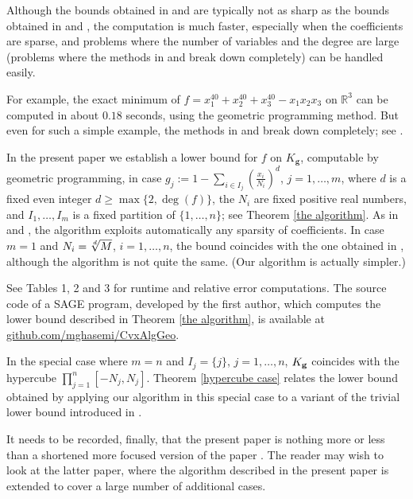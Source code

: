 \documentclass{amsart}
\theoremstyle{definition}
\begin{document}
Although the bounds obtained in \cite{gha-lass-mar} and \cite{gha-mar2} are typically not as sharp as the bounds obtained in \cite{lasserre1} and \cite{WKKM}, the computation is much faster, especially when the coefficients are sparse, and problems where the number of variables and the degree are large (problems where the methods in \cite{lasserre1} and \cite{WKKM} break down completely) can be handled easily.

For example, the exact minimum of $f=x_1^{40}+x_2^{40}+x_3^{40}-x_1x_2x_3$ on $\mathbb{R}^3$ can be computed in about $0.18$ seconds, using the geometric programming method.
But even for such a simple example, the methods in \cite{lasserre1} and \cite{WKKM} break down completely; see \cite[Example 3.9]{gha-mar2}.

In the present paper we establish a lower bound for $f$ on $K_{\mathbf{g}}$, computable by geometric
programming, in case $g_j := 1-\sum_{i\in I_j} (\frac{x_i}{N_i})^d$, $j=1,\dots,m$, where $d$ is a fixed even integer $d \ge \max\{ 2, \deg(f)\}$, the $N_i$ are fixed positive real numbers, and  $I_1,\dots, I_m$ is a fixed partition of $\{ 1,\dots,n\}$; see Theorem \ref{the algorithm}. As in \cite{gha-lass-mar} and \cite{gha-mar2}, the algorithm exploits automatically any sparsity of coefficients.
In case $m=1$ and $N_i = \root d \of{M}$, $i=1,\dots, n$, the bound coincides with the one obtained in \cite{gha-lass-mar}, although the algorithm is not quite the same. (Our algorithm is actually  simpler.)

See Tables 1, 2 and 3 for runtime and relative error computations. The source code of a SAGE program, developed by the first author, which computes the lower bound described in Theorem \ref{the algorithm}, is available at \href{https://github.com/mghasemi/CvxAlgGeo}{github.com/mghasemi/CvxAlgGeo}.

In the special case where $m=n$ and $I_j = \{ j \}$, $j=1,\dots,n$, $K_{\bf g}$ coincides with the hypercube $\prod_{j=1}^n [-N_j,N_j]$. Theorem \ref{hypercube case} relates the lower bound obtained by applying our algorithm in this special case to a variant of the trivial lower bound introduced in \cite[Section 3]{gha-lass-mar}.

It needs to be recorded, finally, that the present paper is nothing more or less than a shortened more focused version of the paper \cite{gha-mar3}. The reader may wish to look at the latter paper, where the algorithm described in the present paper is extended to cover a large number of additional cases.
%
\end{document}
